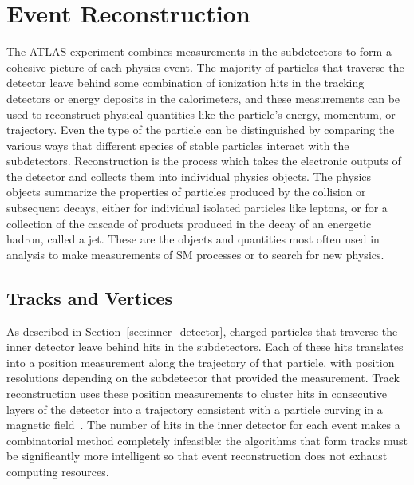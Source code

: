 \chapter{Event Reconstruction}

\label{ch:reconstruction}

The ATLAS experiment combines measurements in the subdetectors to form a cohesive picture of each physics event. 
The majority of particles that traverse the detector leave behind some combination of ionization hits in the tracking detectors or energy deposits in the calorimeters, and these measurements can be used to reconstruct physical quantities like the particle's energy, momentum, or trajectory.
Even the type of the particle can be distinguished by comparing the various ways that different species of stable particles interact with the subdetectors.
Reconstruction is the process which takes the electronic outputs of the detector and collects them into individual physics objects.
The physics objects summarize the properties of particles produced by the collision or subsequent decays, either for individual isolated particles like leptons, or for a collection of the cascade of products produced in the decay of an energetic hadron, called a jet. 
These are the objects and quantities most often used in analysis to make measurements of \ac{SM} processes or to search for new physics.


\section{Tracks and Vertices}
\label{sec:tracks}

As described in Section~\ref{sec:inner_detector}, charged particles that traverse the inner detector leave behind hits in the subdetectors.
Each of these hits translates into a position measurement along the trajectory of that particle, with position resolutions depending on the subdetector that provided the measurement. 
Track reconstruction uses these position measurements to cluster hits in consecutive layers of the detector into a trajectory consistent with a particle curving in a magnetic field~\cite{newt, tracking_performance}.
The number of hits in the inner detector for each event makes a combinatorial method completely infeasible: the algorithms that form tracks must be significantly more intelligent so that event reconstruction does not exhaust computing resources.

